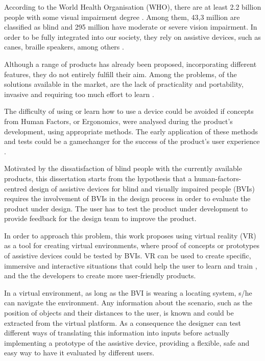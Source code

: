 

According to the World Health Organisation (WHO), there are at least 2.2 billion people with some visual impairment degree \cite{world2019world}. Among them, 43,3 million are classified as blind and 295 million have moderate or severe vision impairment. In order to be fully integrated into our society, they rely on assistive devices, such as canes, braille speakers, among others \cite{bourne2021trends}. 

Although a range of products has already been proposed, incorporating different features, they do not entirely fulfill their aim. Among the problems, of the solutions available in the market, are the lack of practicality and portability, invasive and requiring too much effort to learn \cite{lozano2009electrotactile}.

The difficulty of using or learn how to use a device could be avoided if concepts from Human Factors, or Ergonomics, were analysed during the product’s development, using appropriate methods. The early application of these methods and tests could be a gamechanger for the success of the product's user experience \cite{wolf2019towards}.

Motivated by the dissatisfaction of blind people with the currently available products, this dissertation starts from the hypothesis that a human-factors-centred design of assistive devices for blind and visually impaired people (BVIs) requires the involvement of BVIs in the design process in order to evaluate the product under design. The user has to test the product under development to provide feedback for the design team to improve the product.

In order to approach this problem, this work proposes using virtual reality (VR) as a tool for creating virtual environments, where proof of concepts or prototypes of assistive devices could be tested by BVIs. VR can be used to create specific, immersive and interactive situations that could help the user to learn and train \cite{farrell2018learning}, and the the developers to create more user-friendly products.

In a virtual environment, as long as the BVI is wearing a locating system, s/he can navigate the environment. Any information about the scenario, such as the position of objects and their distances to the user, is known and could be extracted from the virtual platform. As a consequence the designer can test different ways of translating this information into inputs before actually implementing a prototype of the assistive device, providing a flexible, safe and easy way to have it evaluated by different users.


